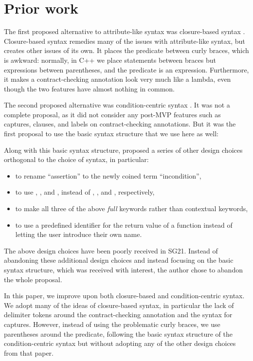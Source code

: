 \section{Prior work}

The first proposed alternative to attribute-like syntax was closure-based syntax \cite{P2461R1}. Closure-based syntax remedies many of the issues with attribute-like syntax, but creates other issues of its own. It places the predicate between curly braces, which is awkward: normally, in C++ we place statements between braces but expressions between parentheses, and the predicate is an expression. Furthermore, it makes a contract-checking annotation look very much like a lambda, even though the two features have almost nothing in common.

The second proposed alternative was condition-centric syntax \cite{P2737R0}. It was not a complete proposal, as it did not consider any post-MVP features such as captures,  clauses, and labels on contract-checking annotations. But it was the first proposal to use the basic syntax structure that we use here as well:

\phantom{~~~}

Along with this basic syntax structure, \cite{P2737R0} proposed a series of other design choices orthogonal to the choice of syntax, in particular:

\begin{itemize}
\item to rename ``assertion'' to the newly coined term ``incondition'',
\item to use , , and , instead of , , and , respectively,
\item to make all three of the above \emph{full} keywords rather than contextual keywords,
\item to use a predefined identifier  for the return value of a function instead of letting the user introduce their own name.
\end{itemize}

The above design choices have been poorly received in SG21. Instead of abandoning these additional design choices and instead focusing on the basic syntax structure, which was received with interest, the author chose to abandon the whole proposal.

In this paper, we improve upon both closure-based and condition-centric syntax. We adopt many of the ideas of closure-based syntax, in particular the lack of delimiter tokens around the contract-checking annotation and the syntax for captures. However, instead of using the problematic curly braces, we use parentheses around the predicate, following the basic syntax structure of the condition-centric syntax \cite{P2737R0} but without adopting any of the other design choices from that paper.

